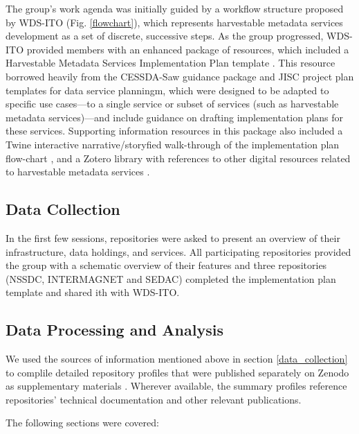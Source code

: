 \documentclass{interact}
\begin{document}
The group's work agenda was initially guided by a workflow structure proposed by WDS-ITO (Fig. \ref{flowchart}), which represents harvestable metadata services development as a set of discrete, successive steps. As the group progressed, WDS-ITO provided members with an enhanced package of resources, which included a Harvestable Metadata Services Implementation Plan template \parencite{urquidi_diaz_template_2021}. This resource borrowed heavily from the CESSDA-Saw guidance package \parencite{bornatici_cessda_2017} and JISC project plan templates \parencite{jisc_jisc_2011} for data service planningm, which were designed to be adapted to specific use cases—to a single service or subset of services (such as harvestable metadata services)—and include guidance on drafting implementation plans for these services. Supporting information resources in this package also included a Twine interactive narrative/storyfied walk-through of the implementation plan flow-chart \parencite{li_interactive_2021}, and a Zotero library with references to other digital resources related to harvestable metadata services \parencite{urquidi_diaz_zotero1_2021, urquidi_diaz_zotero2_2021}. 

\subsection*{Data Collection}\label{data_collection}
In the first few sessions, repositories were asked to present an overview of their infrastructure, data holdings, and services. All participating repositories provided the group with a schematic overview of their features and three repositories (NSSDC, INTERMAGNET and SEDAC) completed the implementation plan template and shared ith with WDS-ITO. 





\subsection*{Data Processing and Analysis}\label{data_processing}


We used the sources of information mentioned above in section \ref{data_collection} to complile detailed repository profiles that were published separately on Zenodo as supplementary materials \parencite{urquidi_diaz_harvestable_2022}. Wherever available, the summary profiles reference repositories' technical documentation and other relevant publications. 

The following sections were covered:
\end{document}
